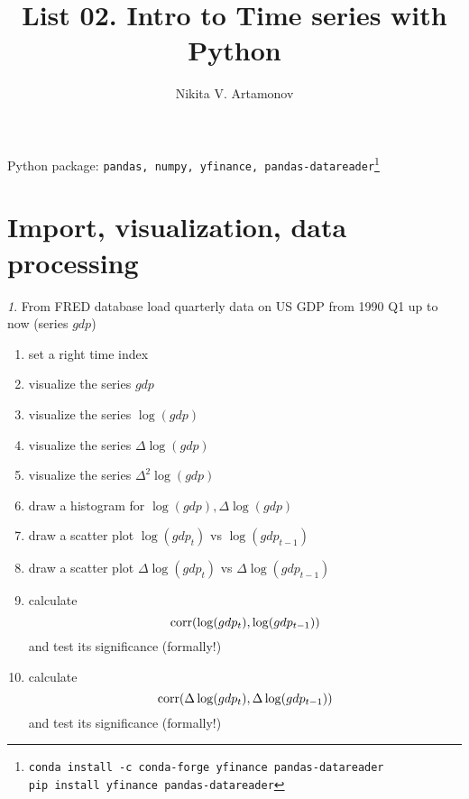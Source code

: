 \documentclass[12pt]{article}
\title{List 02. Intro to Time series with Python}
\author{Nikita V. Artamonov}
\theoremstyle{remark}
\newtheorem{exercise}{}[section]
\begin{document}
\maketitle

Python package: \texttt{pandas, numpy, yfinance, 
pandas-datareader}\footnote{\texttt{conda install -c conda-forge yfinance pandas-datareader}\\
\texttt{pip install yfinance pandas-datareader}}

\tableofcontents

\section{Import, visualization, data processing}

\begin{exercise}
From FRED database load quarterly data on US GDP from 1990 Q1 up to now (series \(gdp\))
\begin{enumerate}
	\item set a right time index
	\item visualize the series \(gdp\)
	\item visualize the series \(\log(gdp)\)
	\item visualize the series \(\Delta\log(gdp)\)
	\item visualize the series \(\Delta^2\log(gdp)\)
	\item draw a histogram for \(\log(gdp),\Delta\log(gdp)\)
	\item draw a scatter plot \(\log(gdp_t)\) vs \(\log(gdp_{t-1})\)
	\item draw a scatter plot \(\Delta\log(gdp_t)\) vs \(\Delta\log(gdp_{t-1})\)
	\item calculate \[\operatorname{corr}(\log(gdp_t), \log(gdp_{t-1}))\] and test its significance (formally!)
	\item calculate \[\operatorname{corr}(\Delta\log(gdp_t), \Delta\log(gdp_{t-1}))\] 
	and test its significance (formally!) 
\end{enumerate}
\end{exercise}
	
\end{document}
